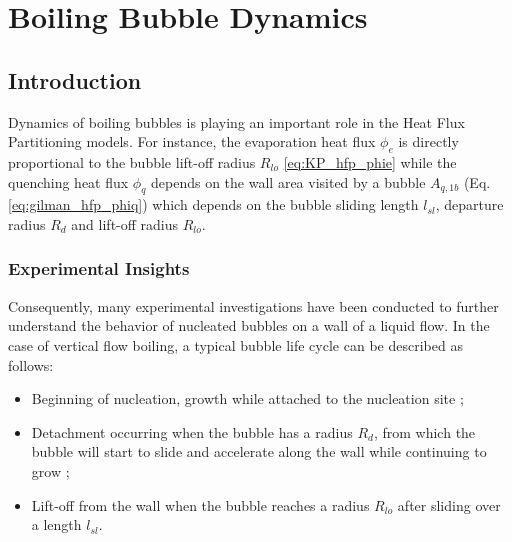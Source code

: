 
\chapter{Boiling Bubble Dynamics} %

\label{chap:bub_dyn} %

\minitoc

\section{Introduction}

Dynamics of boiling bubbles is playing an important role in the Heat Flux Partitioning models. For instance, the evaporation heat flux $\phi_{e}$ is directly proportional to the bubble lift-off radius $R_{lo}$ \ref{eq:KP_hfp_phie} while the quenching heat flux $\phi_{q}$ depends on the wall area visited by a bubble $A_{q,1b}$ (Eq. \ref{eq:gilman_hfp_phiq}) which depends on the bubble sliding length $l_{sl}$, departure radius $R_{d}$ and lift-off radius $R_{lo}$.

\subsection{Experimental Insights}

Consequently, many experimental investigations have been conducted to further understand the behavior of nucleated bubbles on a wall of a liquid flow. In the case of vertical flow boiling, a typical bubble life cycle can be described as follows:

\begin{itemize}
\item Beginning of nucleation, growth while attached to the nucleation site ;

\item Detachment occurring when the bubble has a radius $R_{d}$, from which the bubble will start to slide and accelerate along the wall while continuing to grow ;

\item Lift-off from the wall when the bubble reaches a radius $R_{lo}$ after sliding over a length $l_{sl}$.

\end{itemize}


